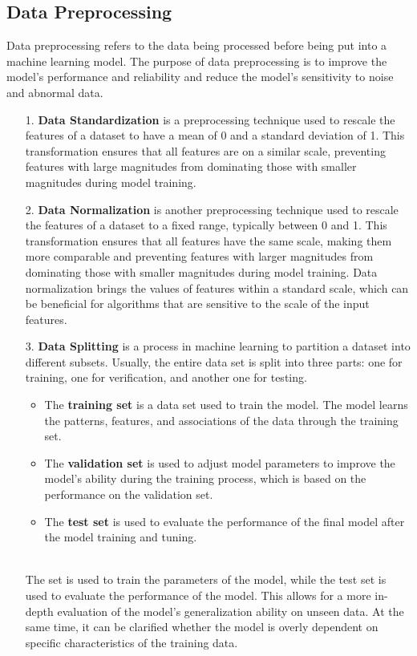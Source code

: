 \documentclass[english,version-2022-01]{uzl-thesis}
\begin{document}
\subsection{Data Preprocessing}
Data preprocessing refers to the data being processed before being put into a machine learning model. The purpose of data preprocessing is to improve the model's performance and reliability and reduce the model's sensitivity to noise and abnormal data.
\begin{enumerate}
\item[1.] \textbf{Data Standardization} is a preprocessing technique used to rescale the features of a dataset to have a mean of 0 and a standard deviation of 1. This transformation ensures that all features are on a similar scale, preventing features with large magnitudes from dominating those with smaller magnitudes during model training.\cite{ali2014data}
\item[2.] \textbf{Data Normalization} is another preprocessing technique used to rescale the features of a dataset to a fixed range, typically between 0 and 1. This transformation ensures that all features have the same scale, making them more comparable and preventing features with larger magnitudes from dominating those with smaller magnitudes during model training. Data normalization brings the values of features within a standard scale, which can be beneficial for algorithms that are sensitive to the scale of the input features.\cite{ali2014data}
\item[3.] \textbf{Data Splitting} is a process in machine learning to partition a dataset into different subsets. Usually, the entire data set is split into three parts: one for training, one for verification, and another one for testing.\cite{scikit-learn}\\
\begin{itemize}
    \item The \textbf{training set} is a data set used to train the model. The model learns the patterns, features, and associations of the data through the training set.
    \item The \textbf{validation set} is used to adjust model parameters to improve the model's ability during the training process, which is based on the performance on the validation set.
    \item The \textbf{test set} is used to evaluate the performance of the final model after the model training and tuning.
\end{itemize}\\
The set is used to train the parameters of the model, while the test set is used to evaluate the performance of the model. This allows for a more in-depth evaluation of the model's generalization ability on unseen data. At the same time, it can be clarified whether the model is overly dependent on specific characteristics of the training data.\\

\end{enumerate}
\end{document}
